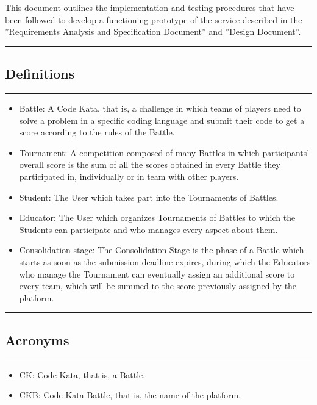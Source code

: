 \documentclass{Configuration_Files/Template}
\begin{document}
This document outlines the implementation and testing procedures that have been followed to develop a functioning prototype of the service described in the ”Requirements Analysis and Specification Document” and ”Design Document”.

{\color{bluepoli}\rule{\linewidth}{0.1pt}}

\subsection{Definitions}

{\color{bluepoli}\rule{\linewidth}{0.1pt}}

\begin{itemize}
\item \textcolor{bluepoli}{Battle:} A Code Kata, that is, a challenge in which teams of players need to solve a problem in a specific coding language and submit their code to get a score according to the rules of the Battle.
\item \textcolor{bluepoli}{Tournament:} A competition composed of many Battles in which participants' overall score is the sum of all the scores obtained in every Battle they participated in, individually or in team with other players.
\item \textcolor{bluepoli}{Student:} The User which takes part into the Tournaments of Battles.
\item \textcolor{bluepoli}{Educator:} The User which organizes Tournaments of Battles to which the Students can participate and who manages every aspect about them.
\item \textcolor{bluepoli}{Consolidation stage:} The Consolidation Stage is the phase of a Battle which starts as soon as the submission deadline expires, during which the Educators who manage the Tournament can eventually assign an additional score to every team, which will be summed to the score previously assigned by the platform.
\end{itemize}

{\color{bluepoli}\rule{\linewidth}{0.1pt}}

\subsection{Acronyms}

{\color{bluepoli}\rule{\linewidth}{0.1pt}}

\begin{itemize}
\item \textcolor{bluepoli}{CK:} Code Kata, that is, a Battle.
\item \textcolor{bluepoli}{CKB:} Code Kata Battle, that is, the name of the platform.
\end{itemize}
\end{document}
